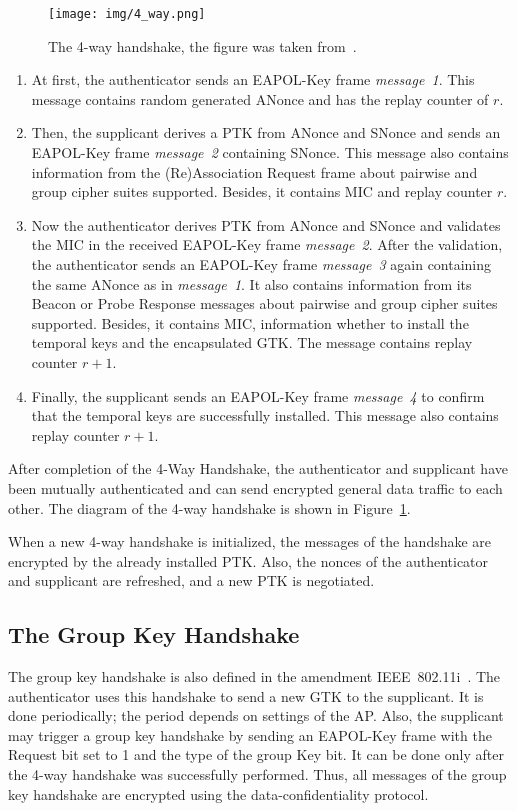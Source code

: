 \begin{figure}[h!]
  \centering
  \texttt{[image: img/4\_way.png]}
  \caption[The 4-way handshake]{The 4-way handshake, the figure was taken from~\cite{ieee802.11i_2004}.}
  \label{fig: 4_way_handshake}
\end{figure}

\begin{enumerate}
    \item At first, the authenticator sends an EAPOL-Key frame \textit{message~1}. This message contains random generated ANonce and has the replay counter of $r$.
    \item Then, the supplicant derives a PTK from ANonce and SNonce and sends an EAPOL-Key frame \textit{message~2} containing SNonce. This message also contains information from the (Re)Association Request frame about pairwise and group cipher suites supported. Besides, it contains MIC and replay counter $r$.
    \item Now the authenticator derives PTK from ANonce and SNonce and validates the MIC in the received EAPOL-Key frame \textit{message~2}. After the validation, the authenticator sends an EAPOL-Key frame \textit{message~3} again containing the same ANonce as in \textit{message~1}. It also contains information from its Beacon or Probe Response messages about pairwise and group cipher suites supported. Besides, it contains MIC, information whether to install the temporal keys and the encapsulated GTK. The message contains replay counter $r+1$.
    \item Finally, the supplicant sends an EAPOL-Key frame \textit{message~4} to confirm that the temporal keys are successfully installed. This message also contains replay counter $r+1$.
\end{enumerate}

After completion of the 4-Way Handshake, the authenticator and supplicant have been mutually authenticated and can send encrypted general data traffic to each other. The diagram of the 4-way handshake is shown in Figure~\ref{fig: 4_way_handshake}.

When a new 4-way handshake is initialized, the messages of the handshake are encrypted by the already installed PTK. Also, the nonces of the authenticator and supplicant are refreshed, and a new PTK is negotiated.

\subsection{The Group Key Handshake}
The group key handshake is also defined in the amendment IEEE~802.11i~\cite{ieee802.11i_2004}. The authenticator uses this handshake to send a new GTK to the supplicant. It is done periodically; the period depends on settings of the AP. Also, the supplicant may trigger a group key handshake by sending an EAPOL-Key frame with the Request bit set to 1 and the type of the group Key bit. It can be done only after the 4-way handshake was successfully performed. Thus, all messages of the group key handshake are encrypted using the data-confidentiality protocol.

